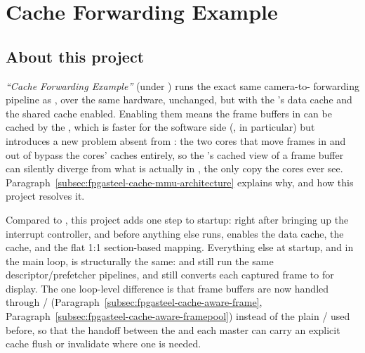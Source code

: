 \chapter{Cache Forwarding Example}
\label{chap:fpgasteel-cache-forwarding}

\section{About this project}
\label{sec:fpgasteel-cache-forwarding-about}

\textit{``Cache Forwarding Example''} (under ) runs the exact same camera-to- forwarding pipeline as , over the same  hardware, unchanged, but with the 's data cache and the shared  cache enabled. Enabling them means the frame buffers in  can be cached by the , which is faster for the software side (, in particular) but introduces a new problem absent from : the two  cores that move frames in and out of  bypass the  cores' caches entirely, so the 's cached view of a frame buffer can silently diverge from what is actually in , the only copy the  cores ever see. Paragraph~\ref{subsec:fpgasteel-cache-mmu-architecture} explains why, and how this project resolves it.

Compared to , this project adds one step to startup: right after bringing up the interrupt controller, and before anything else runs,  enables the  data cache, the  cache, and the flat 1:1 section-based  mapping. Everything else at startup, and in the main loop, is structurally the same:  and  still run the same descriptor/prefetcher pipelines, and  still converts each captured frame to  for display. The one loop-level difference is that frame buffers are now handled through / (Paragraph~\ref{subsec:fpgasteel-cache-aware-frame}, Paragraph~\ref{subsec:fpgasteel-cache-aware-framepool}) instead of the plain / used before, so that the handoff between the  and each  master can carry an explicit cache flush or invalidate where one is needed.

